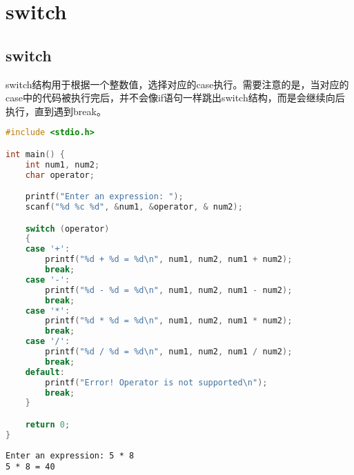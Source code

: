 \newpage

\section{switch}

\subsection{switch}

switch结构用于根据一个整数值，选择对应的case执行。需要注意的是，当对应的case中的代码被执行完后，并不会像if语句一样跳出switch结构，而是会继续向后执行，直到遇到break。\\


\begin{lstlisting}[language=C]
#include <stdio.h>

int main() {
	int num1, num2;
	char operator;

	printf("Enter an expression: ");
	scanf("%d %c %d", &num1, &operator, & num2);

	switch (operator)
	{
	case '+':
		printf("%d + %d = %d\n", num1, num2, num1 + num2);
		break;
	case '-':
		printf("%d - %d = %d\n", num1, num2, num1 - num2);
		break;
	case '*':
		printf("%d * %d = %d\n", num1, num2, num1 * num2);
		break;
	case '/':
		printf("%d / %d = %d\n", num1, num2, num1 / num2);
		break;
	default:
		printf("Error! Operator is not supported\n");
		break;
	}

	return 0;
}
\end{lstlisting}

\begin{tcolorbox}
	\begin{verbatim}
Enter an expression: 5 * 8
5 * 8 = 40
	\end{verbatim}
\end{tcolorbox}

\newpage